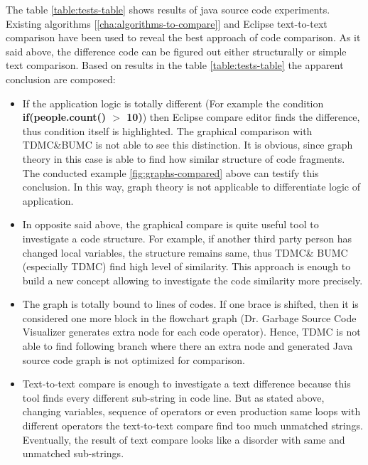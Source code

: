 \documentclass{report}
\begin{document}
The table \ref{table:tests-table} shows results of java source code experiments. Existing algorithms [\ref{cha:algorithms-to-compare}] and Eclipse text-to-text comparison have been used to reveal the best approach of code comparison. As it said above, the difference code can be figured out either structurally or simple text comparison. Based on results in the table \ref{table:tests-table} the apparent conclusion are composed:
\begin{itemize}
	\item If the application logic is totally different (For example the condition \\ \textbf{if(people.count() $>$ 10)}) then Eclipse compare editor finds the difference, thus condition itself is highlighted. The graphical comparison with  TDMC\&BUMC  is not able to see this distinction. It is obvious, since graph theory in this case is able to find how similar structure of code fragments. The conducted example \ref{fig:graphs-compared} above can testify this conclusion. In this way, graph theory is not applicable to differentiate logic of application.
	
	\item In opposite said above, the graphical compare is quite useful tool to investigate a code structure. For example, if another third party person has changed local variables, the structure remains same, thus TDMC\& BUMC (especially TDMC) find high level of similarity. This approach is enough to build a new concept allowing to investigate the code similarity more precisely. 
	
	\item The graph is totally bound to lines of codes. If one brace is shifted, then it is considered one more block in the flowchart graph (Dr. Garbage Source Code Visualizer \cite{drgarbage} generates extra node for each code operator). Hence, TDMC is not able to find following branch where there an extra node and generated Java source code graph is not optimized for comparison.
	
	\item Text-to-text compare is enough to investigate a text difference because this tool finds every different sub-string in code line. But as stated above, changing variables, sequence of operators or even production same loops with different operators the text-to-text compare find too much unmatched strings. Eventually, the result of text compare looks like a disorder with same and unmatched sub-strings.  	

\end{itemize}
\end{document}
